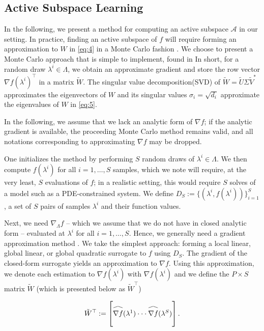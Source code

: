 \documentclass{amsart}
\newcommand{\A}{\mathcal{A}}
\newcommand\reallywidehat[1]{\arraycolsep=0pt\relax%
\begin{array}{c}
\stretchto{
  \scaleto{
    \scalerel*[\widthof{\ensuremath{#1}}]{\kern-.5pt\bigwedge\kern-.5pt}
    {\rule[-\textheight/2]{1ex}{\textheight}} %
  }{\textheight} %
}{0.5ex}\\           %
#1\\                 %
\rule{-1ex}{0ex}
\end{array}
}
\begin{document}
\subsection{Active Subspace Learning}

In the following, we present a method for computing an active subspace $\A$ in our setting. In practice, finding an active subspace of $f$ will require forming an approximation to $W$ in \eqref{eq:4} in a Monte Carlo fashion \cite{ConstantineMC}. We choose to present a Monte Carlo approach that is simple to implement, found in \cite{Russi} In short, for a random draw $\lambda^i \in \Lambda$, we obtain an approximate gradient and store the row vector $\nabla f(\lambda^i)^\top$ in a matrix $\tilde{W}$. The singular value decomposition(SVD) of $\tilde{W}=\tilde{U} \Sigma \tilde{V}^*$ approximates the eigenvectors of
$W$ and its singular values $\sigma_i=\sqrt{d_i}$ approximate the eigenvalues of $W$ in \eqref{eq:5}. %

In the following, we assume that we lack an analytic form of $\nabla f$; if the analytic gradient is available, the proceeding Monte Carlo method remains valid, and all notations corresponding to approximating $\nabla f$ may be dropped.


One initializes the method by performing $S$ random draws of $\lambda^i \in \Lambda$. We then compute $f(\lambda^i)$ for all $i=1,\ldots,S$ samples, which we note will require, at the very least, $S$ evaluations of $f$; in a realistic setting, this would require $S$ solves of a model such as a PDE-constrained system. We define $D_S:=\{(\lambda^i,f(\lambda^i))\}_{i=1}^S$, a set of $S$ pairs of samples $\lambda^i$ and their function values. 

Next, we need $\nabla_\Lambda f$ -- which we assume that we do not have in closed analytic form -- evaluated at $\lambda^i$ for all $i=1,\ldots,S$. Hence, we generally need a gradient approximation method \cite{Constantine2015, Smith}.  We take the simplest approach: forming a local linear, global linear, or global quadratic surrogate to $f$ using $D_S$. The gradient of the closed-form surrogate yields an approximation to  $\nabla f$. %
Using  this approximation, we denote each estimation to $\nabla f(\lambda^i)$ with $\hat{\nabla f}(\lambda^i)$ and we define the $P \times S$ matrix $\tilde{W}$ (which is presented below as $\tilde{W}^\top$)

\begin{equation} \label{eq:16}
\tilde{W}^\top:=\begin{bmatrix}
\reallywidehat{\nabla f}(\lambda^1)
\cdot \cdot \cdot
\reallywidehat{\nabla f}(\lambda^S)\\
\end{bmatrix}.
\end{equation}  
\end{document}
